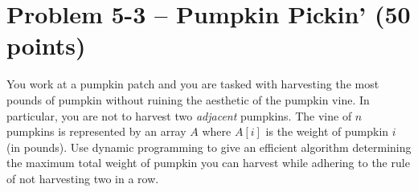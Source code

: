 
\section*{Problem 5-3 -- Pumpkin Pickin' (50 points)}


You work at a pumpkin patch and you are tasked with harvesting the most pounds of pumpkin without ruining the aesthetic of the pumpkin vine.  In particular, you are not to harvest two \emph{adjacent} pumpkins.  The vine of $n$ pumpkins is represented by an array $A$ where $A[i]$ is the weight of pumpkin $i$ (in pounds). Use dynamic programming to give an efficient algorithm determining the maximum total weight of pumpkin you can harvest while adhering to the rule of not harvesting two in a row. 

